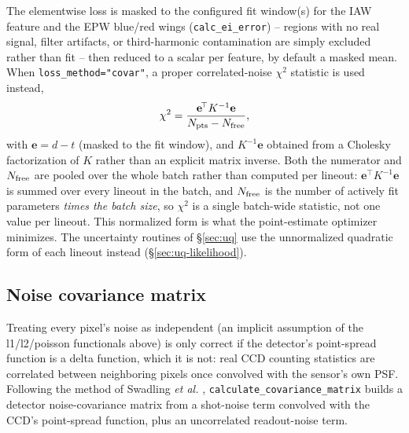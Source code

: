 \documentclass[11pt]{article}
\newcommand{\code}[1]{\texttt{#1}}
\begin{document}
The elementwise loss is masked to the configured fit window(s) for the IAW feature and the
EPW blue/red wings (\code{calc\_ei\_error}) -- regions with no real signal, filter
artifacts, or third-harmonic contamination are simply excluded rather than fit -- then
reduced to a scalar per feature, by default a masked mean. When
\code{loss\_method="covar"}, a proper correlated-noise $\chi^2$ statistic is used instead,
\begin{equation}
  \chi^2 = \frac{\mathbf e^{\!\top}K^{-1}\mathbf e}{N_{\rm pts}-N_{\rm free}},
\end{equation}
with $\mathbf e=d-t$ (masked to the fit window), and $K^{-1}\mathbf e$ obtained from a
Cholesky factorization of $K$ rather than an explicit matrix inverse. Both the numerator and
$N_{\rm free}$ are pooled over the whole batch rather than computed per lineout: $\mathbf
e^{\!\top}K^{-1}\mathbf e$ is summed over every lineout in the batch, and $N_{\rm free}$ is
the number of actively fit parameters \emph{times the batch size}, so $\chi^2$ is a single
batch-wide statistic, not one value per lineout. This normalized form is what the
point-estimate optimizer minimizes. The uncertainty routines of \S\ref{sec:uq} use the
unnormalized quadratic form of each lineout instead (\S\ref{sec:uq-likelihood}).

\subsection{Noise covariance matrix}\label{sec:covar}

Treating every pixel's noise as independent (an implicit assumption of the l1/l2/poisson
functionals above) is only correct if the detector's point-spread function is a delta
function, which it is not: real CCD counting statistics are correlated between neighboring
pixels once convolved with the sensor's own PSF. Following the method of Swadling
\textit{et al.} \cite{swadling2022}, \code{calculate\_covariance\_matrix} builds a detector
noise-covariance matrix from a shot-noise term convolved with the CCD's point-spread
function, plus an uncorrelated readout-noise term.
\end{document}
